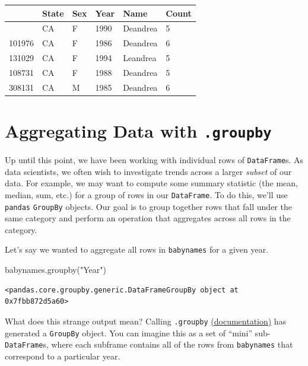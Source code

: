 \documentclass[
  letterpaper,
  DIV=11,
  numbers=noendperiod]{scrreprt}
\newenvironment{Shaded}{\begin{snugshade}}{\end{snugshade}}
\newcommand{\NormalTok}[1]{\textcolor[rgb]{0.00,0.23,0.31}{#1}}
\newcommand{\StringTok}[1]{\textcolor[rgb]{0.13,0.47,0.30}{#1}}
\begin{document}
\begin{longtable}[]{@{}llllll@{}}
\toprule\noalign{}
& State & Sex & Year & Name & Count \\
\midrule\noalign{}
\endhead
\bottomrule\noalign{}
\endlastfoot
115957 & CA & F & 1990 & Deandrea & 5 \\
101976 & CA & F & 1986 & Deandrea & 6 \\
131029 & CA & F & 1994 & Leandrea & 5 \\
108731 & CA & F & 1988 & Deandrea & 5 \\
308131 & CA & M & 1985 & Deandrea & 6 \\
\end{longtable}

\section{\texorpdfstring{Aggregating Data with
\texttt{.groupby}}{Aggregating Data with .groupby}}\label{aggregating-data-with-.groupby}

Up until this point, we have been working with individual rows of
\texttt{DataFrame}s. As data scientists, we often wish to investigate
trends across a larger \emph{subset} of our data. For example, we may
want to compute some summary statistic (the mean, median, sum, etc.) for
a group of rows in our \texttt{DataFrame}. To do this, we'll use
\texttt{pandas} \texttt{GroupBy} objects. Our goal is to group together
rows that fall under the same category and perform an operation that
aggregates across all rows in the category.

Let's say we wanted to aggregate all rows in \texttt{babynames} for a
given year.

\begin{Shaded}
\begin{Highlighting}[]
\NormalTok{babynames.groupby(}\StringTok{"Year"}\NormalTok{)}
\end{Highlighting}
\end{Shaded}

\begin{verbatim}
<pandas.core.groupby.generic.DataFrameGroupBy object at 0x7fbb872d5a60>
\end{verbatim}

What does this strange output mean? Calling \texttt{.groupby}
\href{https://pandas.pydata.org/pandas-docs/stable/reference/api/pandas.DataFrame.groupby.html}{(documentation)}
has generated a \texttt{GroupBy} object. You can imagine this as a set
of ``mini'' sub-\texttt{DataFrame}s, where each subframe contains all of
the rows from \texttt{babynames} that correspond to a particular year.
\end{document}
